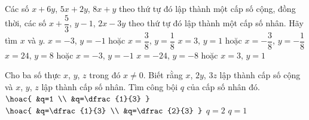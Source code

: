 \begin{ex}%
	Các số $x+6y$, $5x+2y$, $8x+y$ theo thứ tự đó lập thành một cấp số cộng, đồng thời, các số $x+\dfrac{5}{3}$, $y-1$, $2x-3y$  theo thứ tự đó lập thành một cấp số nhân. Hãy tìm $x$ và $y$.
	\choice 
		{\True $x=-3$, $y=-1$ hoặc $x=\dfrac{3}{8}$, $ y=\dfrac{1}{8}$} 
		{$x=3$, $y=1$ hoặc $x=-\dfrac{3}{8}$, $  y=-\dfrac{1}{8}$}
		 {$x=24$, $y=8$ hoặc $x=-3$, $y=-1$}
		{$x=-24$, $y=-8$ hoặc $x=3$,  $y=1$}
\end{ex}

\begin{ex}%
	Cho ba số thực $x$, $y$, $z$ trong đó $x\ne 0$. Biết rằng $x$, $2y$, $3z$ lập  thành cấp số cộng và $x$, $y$, $z$ lập thành cấp số nhân. Tìm công bội $q$ của cấp số nhân đó.
	 \choice
		{\True $\hoac{  &q=1 \\ &q=\dfrac{1}{3} }$}
		{$\hoac{  &q=\dfrac{1}{3} \\ &q=\dfrac{2}{3} }$}
		{$q=2$} 
		{$q=1$} 
\end{ex}

